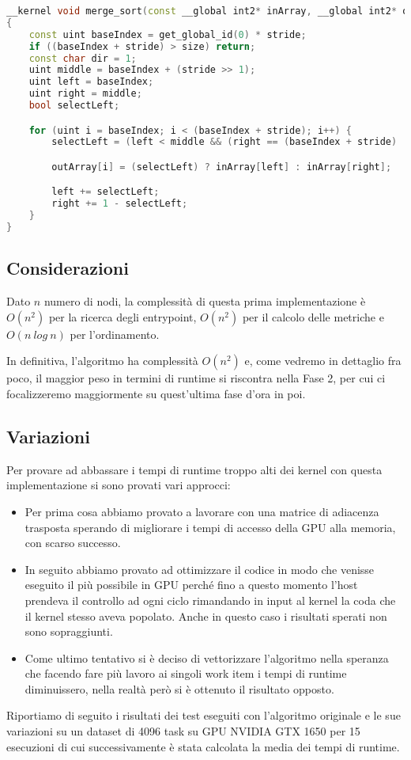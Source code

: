 \documentclass[../relazione.tex]{subfiles}
\begin{document}
\begin{lstlisting}[language=C++, caption={MergeSort kernel for metrics couple array, source: \url{https://github.com/Gram21/GPUSorting}},captionpos=b]
__kernel void merge_sort(const __global int2* inArray, __global int2* outArray, const uint stride, const uint size)
{
	const uint baseIndex = get_global_id(0) * stride;
	if ((baseIndex + stride) > size) return;
	const char dir = 1;
	uint middle = baseIndex + (stride >> 1);
	uint left = baseIndex;
	uint right = middle;
	bool selectLeft;

	for (uint i = baseIndex; i < (baseIndex + stride); i++) {
		selectLeft = (left < middle && (right == (baseIndex + stride) || lte(inArray[left], inArray[right]))) == dir;

		outArray[i] = (selectLeft) ? inArray[left] : inArray[right];

		left += selectLeft;
		right += 1 - selectLeft;
	}
}
\end{lstlisting}

\subsection{Considerazioni}
Dato $n$ numero di nodi, la complessità di questa prima implementazione è $O(n^2)$ per la ricerca degli entrypoint, $O(n^2)$ per il calcolo delle metriche e $O(n\ log\ n)$ per l'ordinamento.

In definitiva, l'algoritmo ha complessità $O(n^2)$ e, come vedremo in dettaglio fra poco, il maggior peso in termini di runtime si riscontra nella Fase 2, per cui ci focalizzeremo maggiormente su quest'ultima fase d'ora in poi.

\subsection{Variazioni}
Per provare ad abbassare i tempi di runtime troppo alti dei kernel con questa implementazione si sono provati vari approcci:
\begin{itemize}
    \item Per prima cosa abbiamo provato a lavorare con una matrice di adiacenza trasposta sperando di migliorare i tempi di accesso della GPU alla memoria, con scarso successo.
    \item In seguito abbiamo provato ad ottimizzare il codice in modo che venisse eseguito il più possibile in GPU perché fino a questo momento l'host prendeva il controllo ad ogni ciclo rimandando in input al kernel la coda che il kernel stesso aveva popolato. Anche in questo caso i risultati sperati non sono sopraggiunti.
    \item Come ultimo tentativo si è deciso di vettorizzare l'algoritmo nella speranza che facendo fare più lavoro ai singoli work item i tempi di runtime diminuissero, nella realtà però si è ottenuto il risultato opposto.
\end{itemize}    
Riportiamo di seguito i risultati dei test eseguiti con l'algoritmo originale e 
le sue variazioni su un dataset di 4096 task su GPU NVIDIA GTX 1650 per 15 esecuzioni di cui successivamente è stata calcolata la media dei tempi di runtime.
\end{document}
